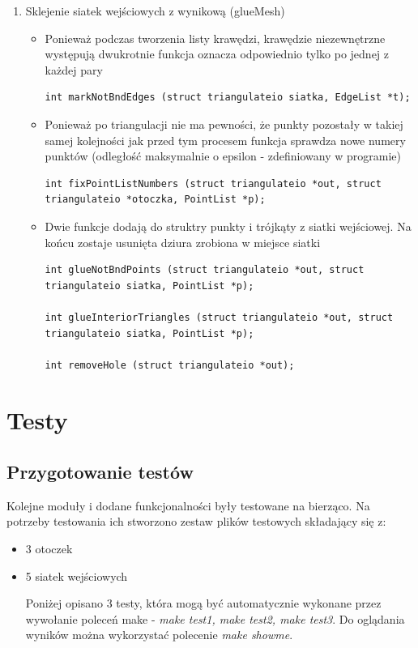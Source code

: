 \documentclass[a4paper,12pt,twoside]{article}
\begin{document}
\begin{enumerate}
\item Sklejenie siatek wejściowych z wynikową (glueMesh)

\begin{itemize}

\item Ponieważ podczas tworzenia listy krawędzi, krawędzie niezewnętrzne występują dwukrotnie funkcja oznacza odpowiednio tylko po jednej z każdej pary 
\begin{lstlisting}
int markNotBndEdges (struct triangulateio siatka, EdgeList *t);
\end{lstlisting}

\item Ponieważ po triangulacji nie ma pewności, że punkty pozostały w takiej samej kolejności jak przed tym procesem funkcja sprawdza nowe numery punktów (odległość maksymalnie o epsilon - zdefiniowany w programie) 
\begin{lstlisting}
int fixPointListNumbers (struct triangulateio *out, struct triangulateio *otoczka, PointList *p);
\end{lstlisting}

\item Dwie funkcje dodają do struktry punkty i trójkąty z siatki wejściowej. Na końcu zostaje usunięta dziura zrobiona w miejsce siatki
\begin{lstlisting}
int glueNotBndPoints (struct triangulateio *out, struct triangulateio siatka, PointList *p);

int glueInteriorTriangles (struct triangulateio *out, struct triangulateio siatka, PointList *p);

int removeHole (struct triangulateio *out);
\end{lstlisting}

\end{itemize}

\end{enumerate}

\section{Testy}

\subsection{Przygotowanie testów}
Kolejne moduły i dodane funkcjonalności były testowane na bierząco. Na potrzeby testowania ich stworzono zestaw plików testowych składający się z:
\begin{itemize}
\item 3 otoczek 
\item 5 siatek wejściowych 

Poniżej opisano 3 testy, która mogą być automatycznie wykonane przez wywołanie poleceń make - \textit{make test1, make test2, make test3}. Do oglądania wyników można wykorzystać polecenie \textit{make showme}.
\end{itemize}
\end{document}

